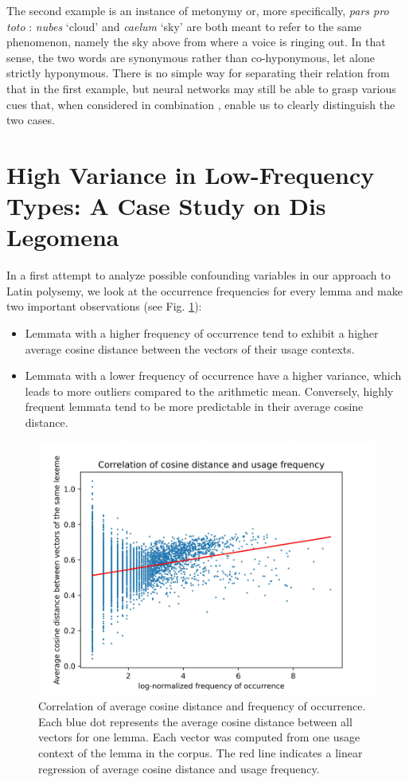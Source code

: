 \documentclass[oneside]{book}
\begin{document}
The second example is an instance of metonymy or, more specifically, \textit{pars pro toto} \parencite[44]{gardenforsSemanticTransformations2015}: \textit{nubes} `cloud' and \textit{caelum} `sky' are both meant to refer to the same phenomenon, namely the sky above from where a voice is ringing out. In that sense, the two words are synonymous rather than co-hyponymous, let alone strictly hyponymous. There is no simple way for separating their relation from that in the first example, but neural networks may still be able to grasp various cues that, when considered in combination \parencite[1]{hintonImprovingNeuralNetworks2012}, enable us to clearly distinguish the two cases.

\section{High Variance in Low-Frequency Types: A Case Study on Dis Legomena}
In a first attempt to analyze possible confounding variables in our approach to Latin polysemy, we look at the occurrence frequencies for every lemma and make two important observations (see Fig. \ref{figure:cosineDistanceVsFrequency}):
\begin{itemize}
	\item Lemmata with a higher frequency of occurrence tend to exhibit a higher average cosine distance between the vectors of their usage contexts.
	\label{firstObservation}
	\item Lemmata with a lower frequency of occurrence have a higher variance, which leads to more outliers compared to the arithmetic mean. Conversely, highly frequent lemmata tend to be more predictable in their average cosine distance.
\end{itemize}
\begin{figure}[ht]
	\includegraphics[width=\linewidth]{cos_dist_vs_freq}
	\caption{Correlation of average cosine distance and frequency of occurrence. Each blue dot represents the average cosine distance between all vectors for one lemma. Each vector was computed from one usage context of the lemma in the corpus. The red line indicates a linear regression of average cosine distance and usage frequency.}
	\label{figure:cosineDistanceVsFrequency}
\end{figure}
\end{document}
